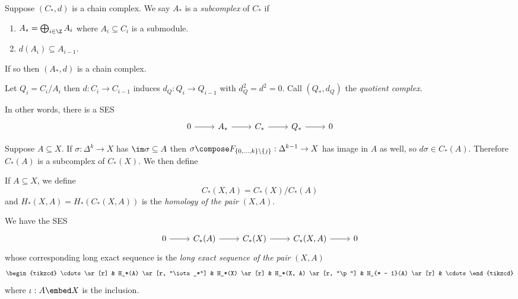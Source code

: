 \documentclass[a4paper]{article}
\renewcommand{\b}{\p}
\begin{document}
\begin{definition}
  Suppose \((C_*, d)\) is a chain complex. We say \(A_*\) is a \emph{subcomplex} of \(C_*\) if
  \begin{enumerate}
  \item \(A_* = \bigoplus_{i \in \Z} A_i\) where \(A_i \subseteq C_i\) is a submodule.
  \item \(d(A_i) \subseteq A_{i - 1}\).
  \end{enumerate}
  If so then \((A_*, d)\) is a chain complex.

  Let \(Q_i = C_i/A_i\) then \(d: C_i \to C_{i - 1}\) induces \(d_Q: Q_i \to Q_{i - 1}\) with \(d_Q^2 = d^2 = 0\). Call \((Q_*, d_Q)\) the \emph{quotient complex}.

  In other words, there is a SES
  \[
    \begin{tikzcd}
      0 \ar[r] & A_* \ar[r] & C_* \ar[r] & Q_* \ar[r] & 0
    \end{tikzcd}
  \]
\end{definition}

Suppose \(A \subseteq X\). If \(\sigma: \Delta^k \to X\) has \(\im \sigma \subseteq A\) then \(\sigma \compose F_{\{0, \dots, k\} \setminus \{j\}}: \Delta^{k - 1} \to X\) has image in \(A\) as well, so \(d \sigma \in C_*(A)\). Therefore \(C_*(A)\) is a subcomplex of \(C_*(X)\). We then define

\begin{definition}
  If \(A \subseteq X\), we define
  \[
    C_*(X, A) = C_*(X)/C_*(A)
  \]
  and \(H_*(X, A) = H_*(C_*(X, A))\) is the \emph{homology of the pair} \((X, A)\).
\end{definition}

We have the SES
\[
  \begin{tikzcd}
    0 \ar[r] & C_*(A) \ar[r] & C_*(X) \ar[r] & C_*(X, A) \ar[r] & 0
  \end{tikzcd}
\]
whose corresponding long exact sequence is the \emph{long exact sequence of the pair} \((X, A)\)
\[
  \begin{tikzcd}
    \cdots \ar[r] & H_*(A) \ar[r, "\iota_*"] & H_*(X) \ar[r] & H_*(X, A) \ar[r, "\b"] & H_{* - 1}(A) \ar[r] & \cdots
  \end{tikzcd}
\]
where \(\iota: A \embed X\) is the inclusion.
\end{document}
